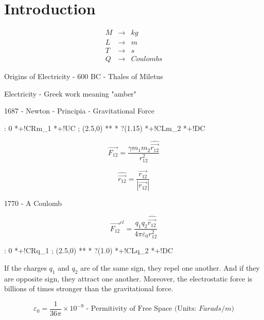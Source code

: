 \documentclass[a4paper,12pt]{article}
\begin{document}


\section{Introduction}

\begin{eqnarray*}
M & \to & kg \\
L & \to & m \\
T & \to & s \\
Q & \to & Coulombs
\end{eqnarray*}

Origins of Electricity - 600 BC - Thales of Miletus

Electricity - Greek work meaning "amber"

1687 - Newton - Principia - Gravitational Force

\begin{table}[hbtp]

\xy <1cm, 0cm>:
0 *+!CR{m_{1}} *+!UC{} ; (2.5,0) **\dir{-} *\dir{>} ?(1.15)
*+!CL{m_{2}} *+!DC{}
\endxy

\end{table}

\[ \vec{F_{12}} = \frac{\gamma m_{1} m_{2} \hat{\vec{r_{12}}}
}{r_{12}^{2} } \]

\[ \hat{\vec{r_{12}}} = \frac{\vec{r_{12}}}{\left| \vec{r_{12}} \right|}
\]

1770 - A Coulomb

\[\vec{F_{12}}^{el} = \frac{q_{1} q_{2} \hat{\vec{r_{12}}} }{ 4 \pi
\varepsilon_{0} r_{12}^{2} } \]

\begin{table}[hbtp]

\xy <1cm, 0cm>:
0 *+!CR{q_{1}} ; (2.5,0) **\dir{-} *\dir{>} ?(1.0)
*+!CL{q_{2}} *+!DC{}
\endxy

\end{table}

If the charges $q_{1}$ and $q_{2}$ are of the same sign, they
repel one another. And if they are opposite sign, they attract one
another. Moreover, the electrostatic force is billions of times stronger
than the gravitational force.

\[ \varepsilon_{0} = \frac{1}{36 \pi} \times 10^{-9} \mbox{  - Permitivity
of Free Space (Units: } Farads/m) \]
\end{document}
